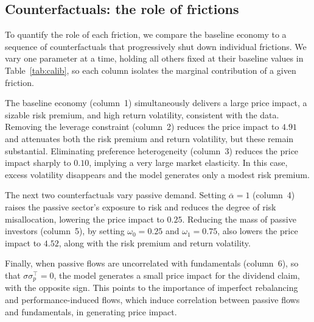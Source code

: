 \documentclass[12pt,english]{article}
\begin{document}


\FloatBarrier

\subsection{Counterfactuals: the role of frictions}\label{sec:counterfactuals}

To quantify the role of each friction, we compare the baseline economy to a sequence of counterfactuals that progressively shut down individual frictions.
We vary one parameter at a time, holding all others fixed at their baseline values in Table~\ref{tab:calib}, so each column isolates the marginal contribution of a given friction.

The baseline economy (column~1) simultaneously delivers a large price impact, a sizable risk premium, and high return volatility, consistent with the data.
Removing the leverage constraint (column~2) reduces the price impact to $4.91$ and attenuates both the risk premium and return volatility, but these remain substantial.
Eliminating preference heterogeneity (column~3) reduces the price impact sharply to $0.10$, implying a very large market elasticity.
In this case, excess volatility disappears and the model generates only a modest risk premium.

The next two counterfactuals vary passive demand.
Setting $\overline{\alpha}=1$ (column~4) raises the passive sector's exposure to risk and reduces the degree of risk misallocation, lowering the price impact to $0.25$.
Reducing the mass of passive investors (column~5), by setting $\omega_0=0.25$ and $\omega_1=0.75$, also lowers the price impact to $4.52$, along with the risk premium and return volatility.

Finally, when passive flows are uncorrelated with fundamentals (column~6), so that $\sigma\sigma_p^\top=0$, the model generates a small price impact for the dividend claim, with the opposite sign.
This points to the importance of imperfect rebalancing and performance-induced flows, which induce correlation between passive flows and fundamentals, in generating price impact.
\end{document}
